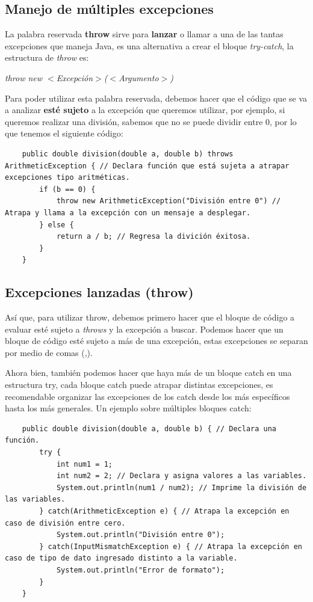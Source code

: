 \subsection{Manejo de múltiples excepciones}
\hspace{0.55cm}La palabra reservada \textbf{throw} sirve para \textbf{lanzar} o llamar a una de las tantas excepciones que maneja Java, es una alternativa a crear el bloque \textit{try-catch}, la estructura de \textit{throw} es:
\begin{center}
	\textit{throw new $<$Excepción$>$($<$Argumento$>$)}
\end{center}

Para poder utilizar esta palabra reservada, debemos hacer que el código que se va a analizar \textbf{esté sujeto} a la excepción que queremos utilizar, por ejemplo, si queremos realizar una división, sabemos que no se puede dividir entre 0, por lo que tenemos el siguiente código:
\begin{lstlisting}
    public double division(double a, double b) throws ArithmeticException { // Declara función que está sujeta a atrapar excepciones tipo aritméticas.
        if (b == 0) {
            throw new ArithmeticException("División entre 0") // Atrapa y llama a la excepción con un mensaje a desplegar.
        } else {
            return a / b; // Regresa la divición éxitosa.
        }
    }
\end{lstlisting}


\subsection{Excepciones lanzadas (throw)}
\hspace{0.55cm}Así que, para utilizar throw, debemos primero hacer que el bloque de código a evaluar esté sujeto a \textit{throws} y la excepción a buscar. Podemos hacer que un bloque de código esté sujeto a más de una excepción, estas excepciones se separan por medio de comas (,).

Ahora bien, también podemos hacer que haya más de un bloque catch en una estructura try, cada bloque catch puede atrapar distintas excepciones, es recomendable organizar las excepciones de los catch desde los más específicos hasta los más generales. Un ejemplo sobre múltiples bloques catch:
\begin{lstlisting}
    public double division(double a, double b) { // Declara una función.
        try {
            int num1 = 1;
            int num2 = 2; // Declara y asigna valores a las variables.
            System.out.println(num1 / num2); // Imprime la división de las variables.
        } catch(ArithmeticException e) { // Atrapa la excepción en caso de división entre cero.
            System.out.println("División entre 0");
        } catch(InputMismatchException e) { // Atrapa la excepción en caso de tipo de dato ingresado distinto a la variable.
            System.out.println("Error de formato");
        }
    }
\end{lstlisting}



